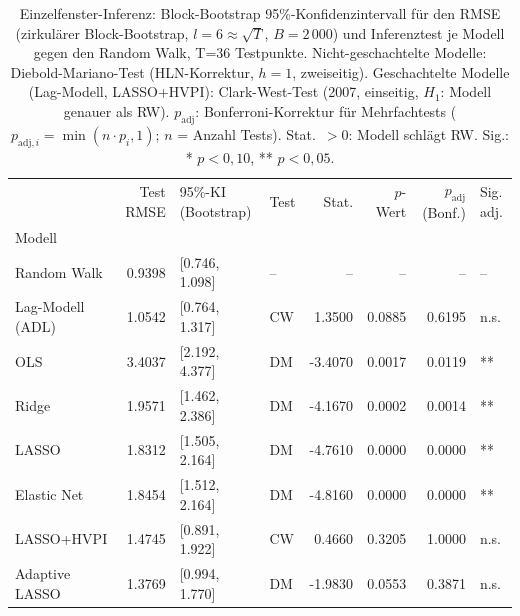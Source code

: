 \begin{table}
\caption{Einzelfenster-Inferenz: Block-Bootstrap 95\%-Konfidenzintervall für den RMSE (zirkulärer Block-Bootstrap, $l=6\approx\sqrt{T}$, $B=2\,000$) und Inferenztest je Modell gegen den Random Walk, T=36 Testpunkte. Nicht-geschachtelte Modelle: Diebold-Mariano-Test (HLN-Korrektur, $h=1$, zweiseitig). Geschachtelte Modelle (Lag-Modell, LASSO+HVPI): Clark-West-Test (2007, einseitig, $H_1$: Modell genauer als RW).  $p_{\mathrm{adj}}$: Bonferroni-Korrektur für Mehrfachtests ($p_{\mathrm{adj},i}=\min(n\cdot p_i,1)$; $n$ = Anzahl Tests). Stat.\ $> 0$: Modell schlägt RW. Sig.: * $p<0{,}10$, ** $p<0{,}05$.}
\label{tab:inferenz}
\begin{tabular}{lrllrrrl}
\toprule
 & Test RMSE & 95\%-KI (Bootstrap) & Test & Stat. & $p$-Wert & $p_{\mathrm{adj}}$ (Bonf.) & Sig. adj. \\
Modell &  &  &  &  &  &  &  \\
\midrule
Random Walk & 0.9398 & [0.746, 1.098] & – & – & – & – & – \\
Lag-Modell (ADL) & 1.0542 & [0.764, 1.317] & CW & 1.3500 & 0.0885 & 0.6195 & n.s. \\
OLS & 3.4037 & [2.192, 4.377] & DM & -3.4070 & 0.0017 & 0.0119 & ** \\
Ridge & 1.9571 & [1.462, 2.386] & DM & -4.1670 & 0.0002 & 0.0014 & ** \\
LASSO & 1.8312 & [1.505, 2.164] & DM & -4.7610 & 0.0000 & 0.0000 & ** \\
Elastic Net & 1.8454 & [1.512, 2.164] & DM & -4.8160 & 0.0000 & 0.0000 & ** \\
LASSO+HVPI & 1.4745 & [0.891, 1.922] & CW & 0.4660 & 0.3205 & 1.0000 & n.s. \\
Adaptive LASSO & 1.3769 & [0.994, 1.770] & DM & -1.9830 & 0.0553 & 0.3871 & n.s. \\
\bottomrule
\end{tabular}
\end{table}
